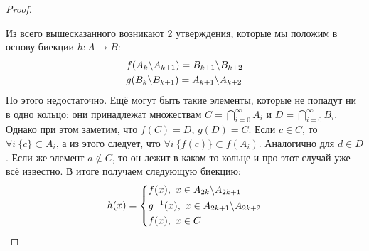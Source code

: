 \begin{proof}
\begin{center}
	\end{center}

	Из всего вышесказанного возникают 2 утверждения, которые мы положим в основу биекции $h \colon A \to B$:
	\begin{align*}
	&{f(A_k \backslash A_{k + 1}) = B_{k + 1} \backslash B_{k + 2}}
	\\
	&{g(B_k \backslash B_{k + 1}) = A_{k + 1} \backslash A_{k + 2}}
	\end{align*}
	Но этого недостаточно. Ещё могут быть такие элементы, которые не попадут ни в одно кольцо: они принадлежат множествам $C = \bigcap\limits_{i = 0}^\infty A_i$ и $D = \bigcap\limits_{i = 0}^\infty B_i$. Однако при этом заметим, что $f(C) = D$, $g(D) = C$. Если $c \in C$, то $\forall i\ \{c\} \subset A_i$, а из этого следует, что $\forall i\ \{f(c)\} \subset f(A_i)$. Аналогично для $d \in D$. Если же элемент $a \notin C$, то он лежит в каком-то кольце и про этот случай уже всё известно. В итоге получаем следующую биекцию:
	\[
		h(x) = \left\{\begin{aligned}
			&{f(x),\ x \in A_{2k} \backslash A_{2k + 1}}
			\\
			&{g^{-1}(x),\ x \in A_{2k + 1} \backslash A_{2k + 2}}
			\\
			&{f(x),\ x \in C}
		\end{aligned}\right.
	\]
\end{proof}